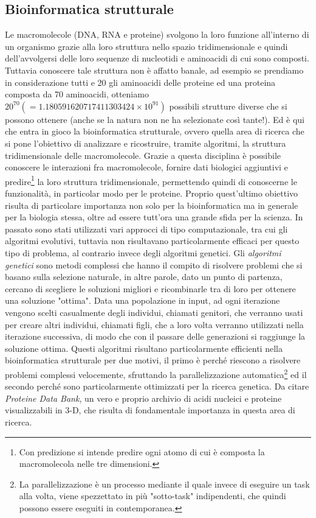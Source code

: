 \subsection{Bioinformatica strutturale}
Le macromolecole (DNA, RNA e proteine) svolgono la loro funzione all'interno di un organismo grazie alla loro struttura nello spazio tridimensionale e quindi dell'avvolgersi delle loro sequenze di nucleotidi e aminoacidi di cui sono composti. Tuttavia conoscere tale struttura non è affatto banale, ad esempio se prendiamo in considerazione tutti e 20 gli aminoacidi delle proteine ed una proteina composta da 70 aminoacidi, otteniamo $20^{70}(=1.180591620717411303424\times{10^{91}})$ possibili strutture diverse che si possono ottenere (anche se la natura non ne ha selezionate  così tante!). Ed è qui che entra in gioco la bioinformatica strutturale, ovvero quella area di ricerca che si pone l'obiettivo di analizzare e ricostruire, tramite algoritmi, la struttura tridimensionale delle macromolecole.
\newline
Grazie a questa disciplina è possibile conoscere le interazioni fra macromolecole, fornire dati biologici aggiuntivi e predire\footnote{Con predizione si intende predire ogni atomo di cui è composta la macromolecola nelle tre dimensioni.} la loro struttura tridimensionale, permettendo quindi di conoscerne le funzionalità, in particolar modo per le proteine. Proprio quest'ultimo obiettivo risulta di particolare importanza non solo per la bioinformatica ma in generale per la biologia stessa, oltre ad essere tutt'ora una grande sfida per la scienza.
\newline
In passato sono stati utilizzati vari approcci di tipo computazionale, tra cui gli algoritmi evolutivi, tuttavia non risultavano particolarmente efficaci per questo tipo di problema, al contrario invece degli algoritmi genetici.
\newline
Gli \textit{algoritmi genetici} sono metodi complessi che hanno il compito di risolvere problemi che si basano sulla selezione naturale, in altre parole, dato un punto di partenza, cercano di scegliere le soluzioni migliori e ricombinarle tra di loro per ottenere una soluzione "ottima". Data una popolazione in input, ad ogni iterazione vengono scelti casualmente degli individui, chiamati genitori, che verranno usati per creare altri individui, chiamati figli, che a loro volta verranno utilizzati nella iterazione successiva, di modo che con il passare delle generazioni si raggiunge la soluzione ottima.
\newline
Questi algoritmi risultano particolarmente efficienti nella bioinformatica strutturale per due motivi, il primo è perché riescono a risolvere problemi complessi velocemente, sfruttando la parallelizzazione automatica\footnote{La parallelizzazione è un processo mediante il quale invece di eseguire un task alla volta, viene spezzettato in più "sotto-task" indipendenti, che quindi possono essere eseguiti in contemporanea.} ed il secondo perché sono particolarmente ottimizzati per la ricerca genetica.
\newline
Da citare \textit{Proteine Data Bank}\cite{proteineDataBank}, un vero e proprio archivio di acidi nucleici e proteine visualizzabili in 3-D, che risulta di fondamentale importanza in questa area di ricerca.

